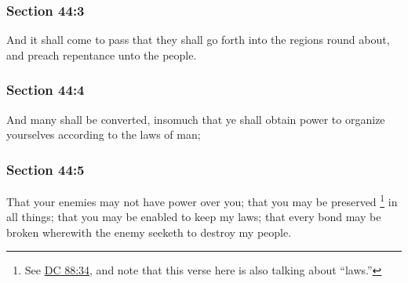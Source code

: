 
	\subsubsection{Section 44:3} %
		\label{DC44-3}

		And it shall come to pass that they shall go forth into the regions round about, and preach repentance unto the people.


	\subsubsection{Section 44:4} %
		\label{DC44-4}

		And many shall be converted, insomuch that ye shall obtain power to organize yourselves according to the laws of man;


	\subsubsection{Section 44:5} %
		\label{DC44-5}

		That your enemies may not have power over you; that you may be preserved%
			\footnote{%
				See \hyperref[DC88-34]{DC 88:34}, and note that this verse here is also talking about ``laws.''
				}
		in all things; that you may be enabled to keep my laws; that every bond may be broken wherewith the enemy seeketh to destroy my people.

